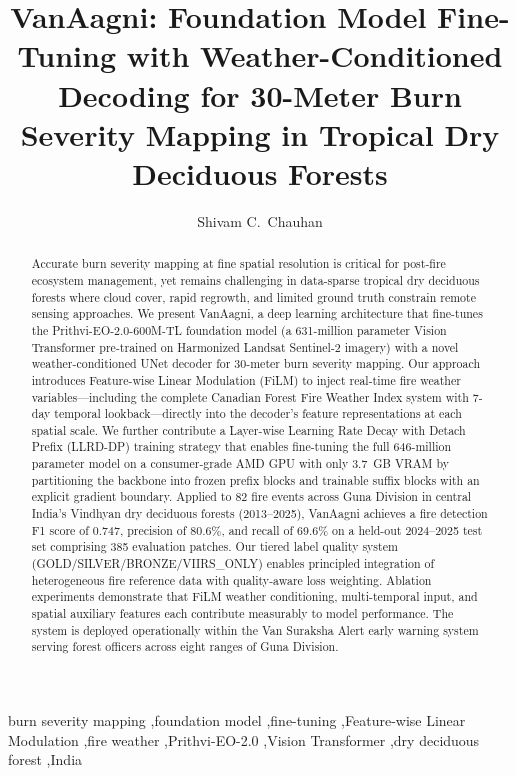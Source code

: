 \documentclass[review,12pt]{elsarticle}
\begin{document}
\begin{frontmatter}

\title{VanAagni: Foundation Model Fine-Tuning with Weather-Conditioned Decoding for 30-Meter Burn Severity Mapping in Tropical Dry Deciduous Forests}

\author[guna]{Shivam C.\ Chauhan}


\begin{abstract}
Accurate burn severity mapping at fine spatial resolution is critical for post-fire ecosystem management, yet remains challenging in data-sparse tropical dry deciduous forests where cloud cover, rapid regrowth, and limited ground truth constrain remote sensing approaches. We present VanAagni, a deep learning architecture that fine-tunes the Prithvi-EO-2.0-600M-TL foundation model (a 631-million parameter Vision Transformer pre-trained on Harmonized Landsat Sentinel-2 imagery) with a novel weather-conditioned UNet decoder for 30-meter burn severity mapping. Our approach introduces Feature-wise Linear Modulation (FiLM) to inject real-time fire weather variables---including the complete Canadian Forest Fire Weather Index system with 7-day temporal lookback---directly into the decoder's feature representations at each spatial scale. We further contribute a Layer-wise Learning Rate Decay with Detach Prefix (LLRD-DP) training strategy that enables fine-tuning the full 646-million parameter model on a consumer-grade AMD GPU with only 3.7~GB VRAM by partitioning the backbone into frozen prefix blocks and trainable suffix blocks with an explicit gradient boundary. Applied to 82 fire events across Guna Division in central India's Vindhyan dry deciduous forests (2013--2025), VanAagni achieves a fire detection F1 score of 0.747, precision of 80.6\%, and recall of 69.6\% on a held-out 2024--2025 test set comprising 385 evaluation patches. Our tiered label quality system (GOLD/SILVER/BRONZE/VIIRS\_ONLY) enables principled integration of heterogeneous fire reference data with quality-aware loss weighting. Ablation experiments demonstrate that FiLM weather conditioning, multi-temporal input, and spatial auxiliary features each contribute measurably to model performance. The system is deployed operationally within the Van Suraksha Alert early warning system serving forest officers across eight ranges of Guna Division.
\end{abstract}

\begin{keyword}
burn severity mapping \sep foundation model \sep fine-tuning \sep Feature-wise Linear Modulation \sep fire weather \sep Prithvi-EO-2.0 \sep Vision Transformer \sep dry deciduous forest \sep India
\end{keyword}

\end{frontmatter}
\end{document}
